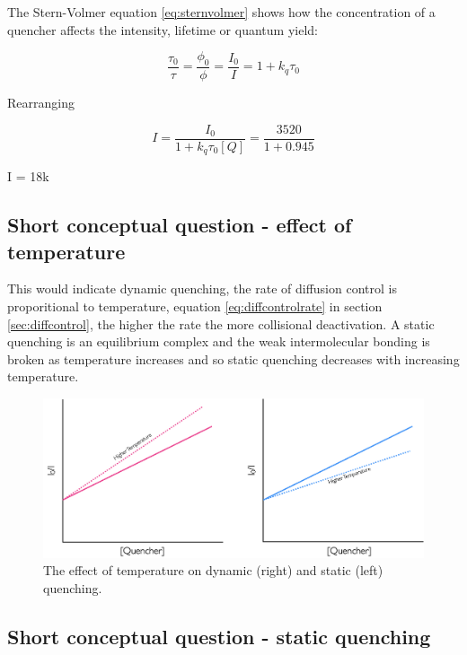 \documentclass[
]{book}
\begin{document}
The Stern-Volmer equation \eqref{eq:sternvolmer} shows how the concentration of a quencher affects the intensity, lifetime or quantum yield:

\begin{equation}
\frac{\tau_0}{\tau}=\frac{\phi_0}{\phi}=\frac{I_0}{I}=1+ k_q \tau_0
\label{eq:sternvolmer}
\end{equation}

Rearranging

\begin{equation*}
I = \frac{I_0}{1 + k_q \tau_0 [Q]}= \frac{3520}{1+0.945}
\end{equation*}

I = 18k

\hypertarget{sec:tempans}{%
\subsection{Short conceptual question - effect of temperature}\label{sec:tempans}}

This would indicate dynamic quenching, the rate of diffusion control is proporitional to temperature, equation \eqref{eq:diffcontrolrate} in section \ref{sec:diffcontrol}, the higher the rate the more collisional deactivation. A static quenching is an equilibrium complex and the weak intermolecular bonding is broken as temperature increases and so static quenching decreases with increasing temperature.

\begin{figure}

{\centering \includegraphics[width=1\linewidth]{images/quenchintensityconc} 

}

\caption{The effect of temperature on dynamic (right) and static (left) quenching.}\label{fig:quenchingtemp}
\end{figure}

\hypertarget{sec:staticans}{%
\subsection{Short conceptual question - static quenching}\label{sec:staticans}}
\end{document}

